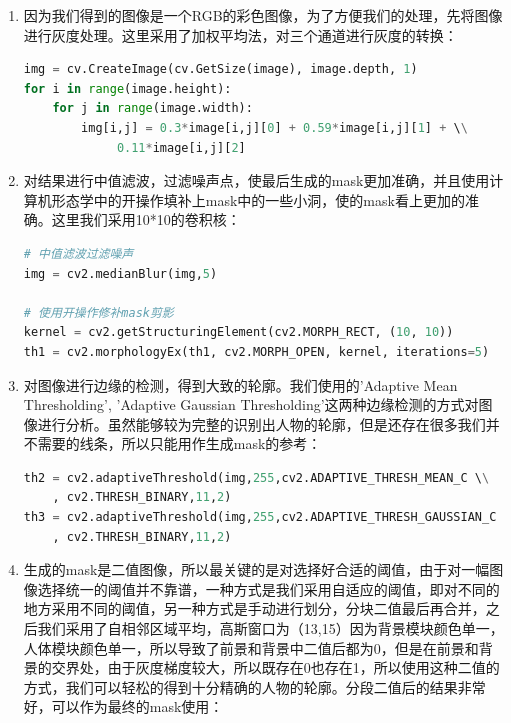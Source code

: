 \documentclass{article}
\begin{document}
\begin{enumerate}

\item 因为我们得到的图像是一个RGB的彩色图像，为了方便我们的处理，先将图像进行灰度处理。这里采用了加权平均法，对三个通道进行灰度的转换：

\begin{lstlisting}[language=python]
img = cv.CreateImage(cv.GetSize(image), image.depth, 1)
for i in range(image.height):
    for j in range(image.width):
        img[i,j] = 0.3*image[i,j][0] + 0.59*image[i,j][1] + \\
        	 0.11*image[i,j][2]
\end{lstlisting}

\item 对结果进行中值滤波，过滤噪声点，使最后生成的mask更加准确，并且使用计算机形态学中的开操作填补上mask中的一些小洞，使的mask看上更加的准确。这里我们采用10*10的卷积核：

\begin{lstlisting}[language=python]
# 中值滤波过滤噪声
img = cv2.medianBlur(img,5)

# 使用开操作修补mask剪影
kernel = cv2.getStructuringElement(cv2.MORPH_RECT, (10, 10))
th1 = cv2.morphologyEx(th1, cv2.MORPH_OPEN, kernel, iterations=5)
\end{lstlisting}

\item  对图像进行边缘的检测，得到大致的轮廓。我们使用的'Adaptive Mean Thresholding', 'Adaptive Gaussian Thresholding'这两种边缘检测的方式对图像进行分析。虽然能够较为完整的识别出人物的轮廓，但是还存在很多我们并不需要的线条，所以只能用作生成mask的参考：

\begin{lstlisting}[language=python]
th2 = cv2.adaptiveThreshold(img,255,cv2.ADAPTIVE_THRESH_MEAN_C \\
	, cv2.THRESH_BINARY,11,2)
th3 = cv2.adaptiveThreshold(img,255,cv2.ADAPTIVE_THRESH_GAUSSIAN_C \\
	, cv2.THRESH_BINARY,11,2)	
\end{lstlisting}

\item 生成的mask是二值图像，所以最关键的是对选择好合适的阈值，由于对一幅图像选择统一的阈值并不靠谱，一种方式是我们采用自适应的阈值，即对不同的地方采用不同的阈值，另一种方式是手动进行划分，分块二值最后再合并，之后我们采用了自相邻区域平均，高斯窗口为（13,15）因为背景模块颜色单一，人体模块颜色单一，所以导致了前景和背景中二值后都为0，但是在前景和背景的交界处，由于灰度梯度较大，所以既存在0也存在1，所以使用这种二值的方式，我们可以轻松的得到十分精确的人物的轮廓。分段二值后的结果非常好，可以作为最终的mask使用：


\end{enumerate}
\end{document}
